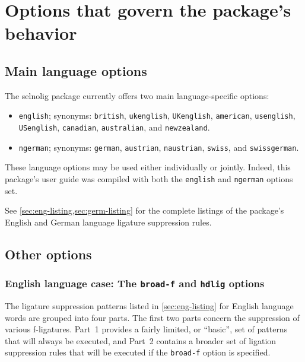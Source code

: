 \documentclass[12pt]{article}
\newcommand{\pkg}[1]{\textsf{#1}}
\newcommand{\opt}[1]{\texttt{#1}}
\begin{document}
\section{Options that govern the package's behavior}

\subsection{Main language options}

The \pkg{selnolig} package currently offers two main language-specific options: 
\begin{itemize}
\item \opt{english}; synonyms: \opt{british}, \opt{ukenglish}, \opt{UKenglish}, \opt{amer\-ican},  \opt{usenglish}, \opt{USenglish}, \opt{cana\-dian}, \opt{australian}, and \opt{new\-zealand}.
\item \opt{ngerman}; synonyms: \opt{german}, \opt{austrian}, \opt{naustrian}, \opt{swiss}, and \opt{swiss\-german}.
\end{itemize}
These language options may be used either individually or jointly. Indeed, this package's user guide was compiled with both the \opt{english} and \opt{ngerman} options set.

See \cref{sec:eng-listing,sec:germ-listing} for the complete listings of the package's English and German language ligature suppression rules.



\subsection{Other options}

\subsubsection[English language case: The broad-f and hdlig options]{English language case: The \opt{broad-f} and \opt{hdlig} options} \label{sec:eng-opt}

The ligature suppression patterns listed in \cref{sec:eng-listing} for English language words are grouped into four parts. The first two parts concern the suppression of various f-ligatures. Part~1 provides a fairly limited, or \enquote{basic}, set of patterns that will always be executed, and Part~2 contains a broader set of ligation suppression rules that will be executed if the \opt{broad-f} option is specified. 
\end{document}
